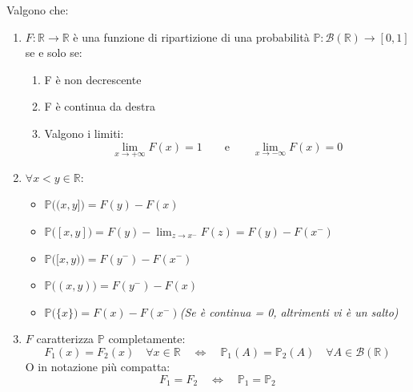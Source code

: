 \begin{teorema}
\label{th:fdr}
    Valgono che:
    \begin{enumerate}
        \item $F:\mathbb{R}\rightarrow\mathbb{R}$ è una funzione di ripartizione di una probabilità $\mathbb{P}:\mathcal{B}(\mathbb{R})\rightarrow[0, 1]$ se e solo se:
        \begin{enumerate}
            \item F è non decrescente
            \item F è continua da destra
            \item Valgono i limiti:
            \[\lim_{x\rightarrow+\infty}F(x) = 1 \qquad \text{e}\qquad \lim_{x\rightarrow-\infty}F(x) = 0\]
        \end{enumerate}
        \item $\forall x<y \in \mathbb{R}:$
        \begin{itemize}
            \item $\mathbb{P}\big((x, y]\big) = F(y) - F(x)$
            \item $\mathbb{P}\big([x, y]\big) = F(y) - \lim_{z\rightarrow x^-}F(z) = F(y)-F(x^-)$
            \item $\mathbb{P}\big([x, y)\big) = F(y^-) - F(x^-)$
            \item $\mathbb{P}\big((x, y)\big) = F(y^-) - F(x)$
            \item $\mathbb{P}\big(\{x\}\big) = F(x) - F(x^-)$\hfill \textit{\small(Se è continua = 0, altrimenti vi è un salto)}
        \end{itemize}
        \item $F$ caratterizza $\mathbb{P}$ completamente:
        \[F_1(x) = F_2(x) \quad \forall x\in\mathbb{R}\quad\iff\quad \mathbb{P}_1(A) = \mathbb{P}_2(A)\quad\forall A\in\mathcal{B}(\mathbb{R})\]
        O in notazione più compatta:
        \[F_1 = F_2 \quad\iff\quad \mathbb{P}_1 = \mathbb{P}_2\]
    \end{enumerate}
\end{teorema}
